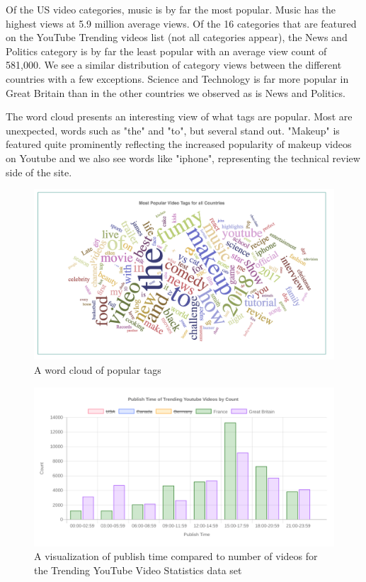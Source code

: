 \documentclass[journal]{vgtc}                %
\begin{document}
Of the US video categories, music is by far the most popular. Music has the highest views at 5.9 million average views. Of the 16 categories that are featured on the YouTube Trending videos list (not all categories appear), the News and Politics category is by far the least popular with an average view count of 581,000. We see a similar distribution of category views between the different countries with a few exceptions. Science and Technology is far more popular in Great Britain than in the other countries we observed as is News and Politics.

The word cloud presents an interesting view of what tags are popular. Most are unexpected, words such as "the" and "to", but several stand out. "Makeup" is featured quite prominently reflecting the increased popularity of makeup videos on Youtube and we also see words like "iphone", representing the technical review side of the site. 

\begin{figure}[tb]
	\centering %
	\includegraphics[width=1\columnwidth]{wordcloud}
	\caption{A word cloud of popular tags}
	\label{fig:wordcloud}
\end{figure}


\begin{figure}[tb]
	\centering %
	\includegraphics[width=1\columnwidth]{publishtimevideocount}
	\caption{A visualization of publish time compared to number of videos for the Trending YouTube Video Statistics data set}
	\label{fig:publishtimevideocount}
\end{figure}
\end{document}
